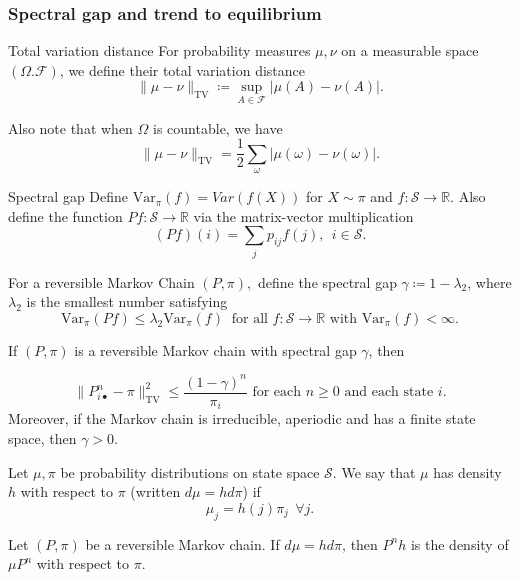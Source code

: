 \subsubsection{Spectral gap and trend to equilibrium}

\begin{defn}{Total variation distance}{}
For probability measures \( \mu , \nu  \) on a measurable space \( (\Omega . \mathcal{F} ) \), we define their total variation distance
\[
    \lVert \mu - \nu  \rVert _{\mathrm{TV} } \coloneqq \sup_{A\in \mathcal{F} } \left\lvert \mu (A) - \nu (A) \right\rvert. 
\]

Also note that when \( \Omega    \) is countable, we have
\[
    \lVert \mu - \nu  \rVert _{\mathrm{TV} } = \frac{1}{2}\sum_{\omega }\left\lvert \mu (\omega ) - \nu (\omega)  \right\rvert  .
\]
\end{defn}

\begin{defn}{Spectral gap}{}
Define \( \mathrm{Var}_{\pi }(f) = Var(f(X))  \) for \( X \sim \pi  \) and \( f:\mathcal{S} \to \mathbb{R}  \). Also define the function \( Pf: \mathcal{S} \to \mathbb{R}  \) via the matrix-vector multiplication
\[
    (Pf)(i) = \sum_{j} p_{ij}f(j) , \ \ i \in \mathcal{S} .
\]

For a reversible Markov Chain \( (P, \pi ), \) define the spectral gap \( \gamma  \coloneqq 1 -\lambda _2 \), where \( \lambda _2 \) is the smallest number satisfying 
\[
    \mathrm{Var} _\pi   (P f) \leq \lambda _2 \mathrm{Var}_\pi  (f) \  \text{ for all } f:\mathcal{S}  \to \mathbb{R} \text{ with } \mathrm{Var}_\pi  (f)< \infty .  
\]
\end{defn}

\begin{thrm}{}{}
If \( (P, \pi ) \) is a reversible Markov chain with spectral gap \( \gamma  \), then 

\[
    \lVert P^n_{i\bullet} - \pi  \rVert ^2_{\mathrm{TV} } \leq \frac{(1 -\gamma )^n}{\pi _{i} } \text{ for each } n\geq 0 \text{ and each state } i.   
\]
Moreover, if the Markov chain is irreducible, aperiodic and has a finite state space, then \( \gamma >0. \) 
\end{thrm}

\begin{defn}{}{}
Let \( \mu ,\pi  \) be probability distributions on state space \( \mathcal{S}  \). We say that \( \mu   \) has density \( h \) with respect to \( \pi  \) (written \( d \mu = h d \pi  \)) if 
\[
    \mu _{j} = h(j)\pi _{j} \ \ \forall j.
\]
\end{defn}

\begin{lem}{}{}
Let \( (P, \pi ) \) be a reversible Markov chain. If \( d \mu  = h d \pi  \), then \( P^n h  \) is the density of \(\mu P^n  \) with respect to \( \pi . \) 
\end{lem}